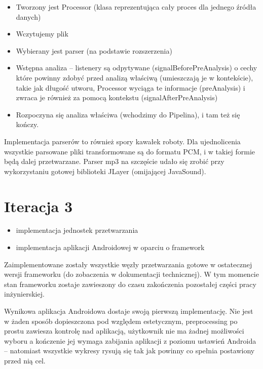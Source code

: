 \begin{Note}
\begin{itemize}
    \item Tworzony jest Processor (klasa reprezentująca cały proces dla jednego źródła danych)
    \item Wczytujemy plik
    \item Wybierany jest parser (na podstawie rozszerzenia)
    \item Wstępna analiza -- listenery są odpytywane (signalBeforePreAnalysis) o cechy które powinny zdobyć przed analizą właściwą (umieszczają je w kontekście), takie jak długość utworu, Processor wyciąga te informacje (preAnalysis) i zwraca je również za pomocą kontekstu (signalAfterPreAnalysis)
    \item Rozpoczyna się analiza właściwa (wchodzimy do Pipelina), i tam też się kończy.
\end{itemize}

Implementacja parserów to również spory kawałek roboty. Dla ujednolicenia wszystkie parsowane pliki transformowane są do formatu PCM, i w takiej formie będą dalej przetwarzane. Parser mp3 na szczęście udało się zrobić przy wykorzystaniu gotowej biblioteki JLayer (omijającej JavaSound).

\end{Note}

\section{Iteracja 3}

\begin{Note}


\begin{itemize}
    \item implementacja jednostek przetwarzania
    \item implementacja aplikacji Androidowej w oparciu o framework
\end{itemize}

Zaimplementowane zostały wszystkie węzły przetwarzania gotowe w ostatecznej wersji frameworku (do zobaczenia w dokumentacji technicznej). W tym momencie stan frameworku zostaje zawieszony do czasu zakończenia pozostałej części pracy inżynierskiej.

Wynikowa aplikacja Androidowa dostaje swoją pierwszą implementację. Nie jest w żaden sposób
dopieszczona pod względem estetycznym, preprocessing po prostu zawiesza kontrolę nad aplikacją,
użytkownik nie ma żadnej możliwości wyboru a kończenie jej wymaga zabijania aplikacji z poziomu
ustawień Androida -- natomiast wszystkie wykresy rysują się tak jak powinny co spełnia postawiony przed nią cel.

\end{Note}

